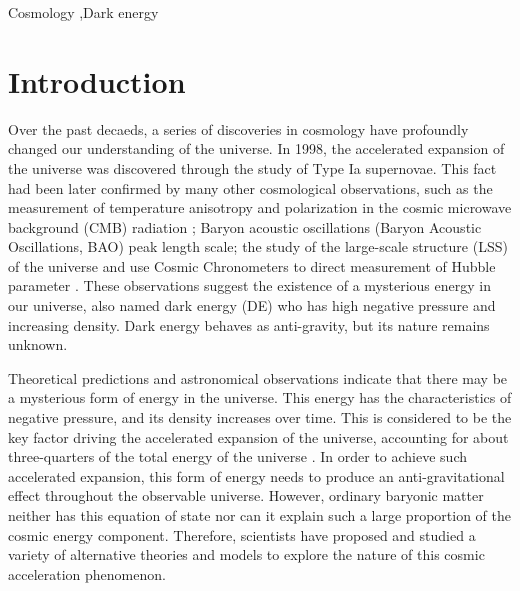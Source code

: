 \documentclass[a4paper,fleqn]{cas-sc}
\begin{document}
\begin{keywords}
Cosmology \sep Dark energy
\end{keywords}

\maketitle

\section{Introduction} \label{sec:intro}
Over the past decaeds, a series of discoveries in cosmology have profoundly changed our understanding of the universe. In 1998, the accelerated expansion of the universe was discovered through the study of Type Ia supernovae\cite{perlmutter_discovery_1998,Riess_1998}. This fact had been later confirmed by many other cosmological observations, such as the measurement of temperature anisotropy and polarization in the cosmic microwave background (CMB) radiation \cite{1992ApJ...396L...1S,2020Planck}; Baryon acoustic oscillations (Baryon Acoustic Oscillations, BAO) peak length scale\cite{Eisenstein_2005,10.1111/j.1365-2966.2011.19592.x}; the study of the large-scale structure (LSS) of the universe \cite{Dodelson_2002,Percival_2007} and use Cosmic Chronometers to direct measurement of Hubble parameter \cite{Daniel_Stern_2010,Moresco_2015}. These observations suggest the existence of a mysterious energy in our universe, also named dark energy (DE)  who has high negative pressure and increasing density. Dark energy behaves as anti-gravity, but its nature remains unknown.

Theoretical predictions and astronomical observations indicate that there may be a mysterious form of energy in the universe. This energy has the characteristics of negative pressure, and its density increases over time. This is considered to be the key factor driving the accelerated expansion of the universe, accounting for about three-quarters of the total energy of the universe \cite{PhysRevD.37.3406,PhysRevD.63.103510,10.1143/PTP.106.929}. In order to achieve such accelerated expansion, this form of energy needs to produce an anti-gravitational effect throughout the observable universe. However, ordinary baryonic matter neither has this equation of state nor can it explain such a large proportion of the cosmic energy component. Therefore, scientists have proposed and studied a variety of alternative theories and models to explore the nature of this cosmic acceleration phenomenon.
\end{document}
